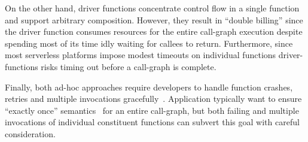 

On the other hand, driver functions concentrate control flow in a single
function and support arbitrary composition. However, they result in ``double
billing'' since the driver function consumes resources for the entire call-graph
execution despite spending most of its time idly waiting for callees to return.
Furthermore, since most serverless platforms impose modest timeouts on
individual functions driver-functions risks timing out before a call-graph is
complete.

Finally, both ad-hoc approaches require developers to handle function crashes,
retries and multiple invocations gracefully~\cite{aws-lambda-retry,
azure-functions-retry, aws-lambda-async-invoke, azure-functions-exec-guarantee}.
Application typically want to ensure ``exactly once'' semantics~\cite{netherite,
beldi, boki, formal-foundation-exec-gtnee} for an entire call-graph, but both
failing and multiple invocations of individual constituent functions can subvert
this goal with careful consideration.





